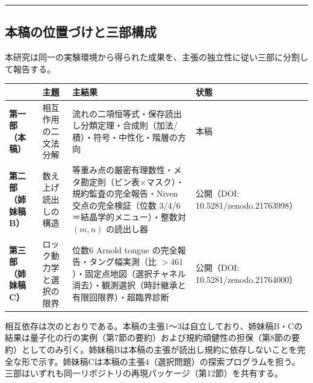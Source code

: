 \documentclass[
  a4paper,
]{ltjsarticle}
\newcounter{none} %
\begin{document}
\begin{center}\rule{0.5\linewidth}{0.5pt}\end{center}

\subsection{本稿の位置づけと三部構成}\label{ux672cux7a3fux306eux4f4dux7f6eux3065ux3051ux3068ux4e09ux90e8ux69cbux6210}

本研究は同一の実験環境から得られた成果を、主張の独立性に従い三部に分割して報告する。

{\def\LTcaptype{none} %
\begin{longtable}[]{@{}
  >{\raggedright\arraybackslash}p{}
  >{\raggedright\arraybackslash}p{}
  >{\raggedright\arraybackslash}p{}
  >{\raggedright\arraybackslash}p{}@{}}
\toprule\noalign{}
\begin{minipage}[b]{\linewidth}\raggedright
\end{minipage} & \begin{minipage}[b]{\linewidth}\raggedright
主題
\end{minipage} & \begin{minipage}[b]{\linewidth}\raggedright
主結果
\end{minipage} & \begin{minipage}[b]{\linewidth}\raggedright
状態
\end{minipage} \\
\midrule\noalign{}
\endhead
\bottomrule\noalign{}
\endlastfoot
\textbf{第一部（本稿）} & 相互作用の二文法分解 &
流れの二項恒等式・保存読出し分類定理・合成則（加法/積）・符号・中性化・階層の方向
& 本稿 \\
\textbf{第二部（姉妹稿B）} & 数え上げ読出しの構造 &
等重み点の厳密有理数性・メタ勘定則（ビン表×マスク）・規約監査の完全報告・Niven
交点の完全検証（位数 3/4/6＝結晶学的メニュー）・整数対 \((m,n)\)
の読出し器 & 公開（DOI: 10.5281/zenodo.21763998） \\
\textbf{第三部（姉妹稿C）} & ロック動力学と選択の限界 & 位数6 Arnold
tongue の完全報告・タング幅実測（比
\(>461\)）・固定点地図（選択チャネル消去）・観測選択（時計継承と有限回限界）・超臨界診断
& 公開（DOI: 10.5281/zenodo.21764000） \\
\end{longtable}
}

相互依存は次のとおりである。本稿の主張1〜3は自立しており、姉妹稿B・Cの結果は量子化の行の実例（第7節の要約）および規約頑健性の担保（第8節の要約）としてのみ引く。姉妹稿Bは本稿の主張が読出し規約に依存しないことを完全な形で示す。姉妹稿Cは本稿の主張4（選択問題）の探索プログラムを担う。三部はいずれも同一リポジトリの再現パッケージ（第12節）を共有する。
\end{document}
